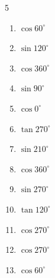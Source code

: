 \begin{multicols}{5}
\begin{enumerate}
  \item $\displaystyle \cos{60^\circ}$


  \item $\displaystyle \sin{120^\circ}$


  \item $\displaystyle \cos{360^\circ}$

        \phantom{$\displaystyle =1$}

  \item $\displaystyle \sin{90^\circ}$

        \phantom{$\displaystyle =1$}

  \item $\displaystyle \cos{0^\circ}$

        \phantom{$\displaystyle =1$}

\columnbreak %

  \item $\displaystyle \tan{270^\circ}$

        \phantom{$\displaystyle なし$}

  \item $\displaystyle \sin{210^\circ}$


  \item $\displaystyle \cos{360^\circ}$

        \phantom{$\displaystyle =1$}

  \item $\displaystyle \sin{270^\circ}$

        \phantom{$\displaystyle =-1$}

  \item $\displaystyle \tan{120^\circ}$


  \item $\displaystyle \cos{270^\circ}$

        \phantom{$\displaystyle =0$}

  \item $\displaystyle \cos{270^\circ}$

        \phantom{$\displaystyle =0$}

  \item $\displaystyle \cos{60^\circ}$


\end{enumerate}
\end{multicols}
